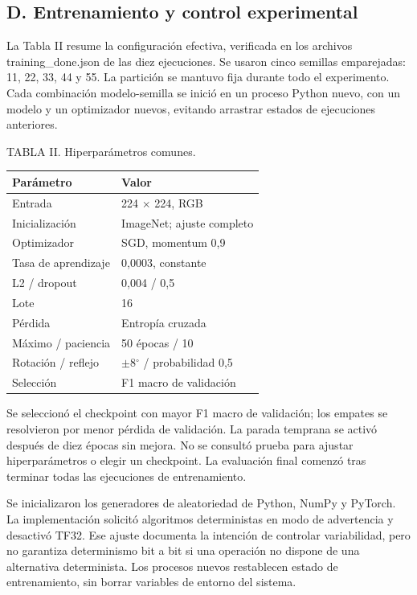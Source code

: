 \documentclass[conference]{IEEEtran}
\begin{document}
\newpage
\subsection*{D. Entrenamiento y control experimental}
La Tabla II resume la configuración efectiva, verificada en los archivos training\_done.json de las diez ejecuciones. Se usaron cinco semillas emparejadas: 11, 22, 33, 44 y 55. La partición se mantuvo fija durante todo el experimento. Cada combinación modelo-semilla se inició en un proceso Python nuevo, con un modelo y un optimizador nuevos, evitando arrastrar estados de ejecuciones anteriores.

\begin{center}\small
TABLA II. Hiperparámetros comunes.\par\medskip
\begin{tabular}{ll}
\toprule
Parámetro & Valor\\\midrule
Entrada & 224 $\times$ 224, RGB\\
Inicialización & ImageNet; ajuste completo\\
Optimizador & SGD, momentum 0,9\\
Tasa de aprendizaje & 0,0003, constante\\
L2 / dropout & 0,004 / 0,5\\
Lote & 16\\
Pérdida & Entropía cruzada\\
Máximo / paciencia & 50 épocas / 10\\
Rotación / reflejo & $\pm$8$^\circ$ / probabilidad 0,5\\
Selección & F1 macro de validación\\
\bottomrule\end{tabular}\end{center}
Se seleccionó el checkpoint con mayor F1 macro de validación; los empates se resolvieron por menor pérdida de validación. La parada temprana se activó después de diez épocas sin mejora. No se consultó prueba para ajustar hiperparámetros o elegir un checkpoint. La evaluación final comenzó tras terminar todas las ejecuciones de entrenamiento.

Se inicializaron los generadores de aleatoriedad de Python, NumPy y PyTorch. La implementación solicitó algoritmos deterministas en modo de advertencia y desactivó TF32. Ese ajuste documenta la intención de controlar variabilidad, pero no garantiza determinismo bit a bit si una operación no dispone de una alternativa determinista. Los procesos nuevos restablecen estado de entrenamiento, sin borrar variables de entorno del sistema.
\end{document}
